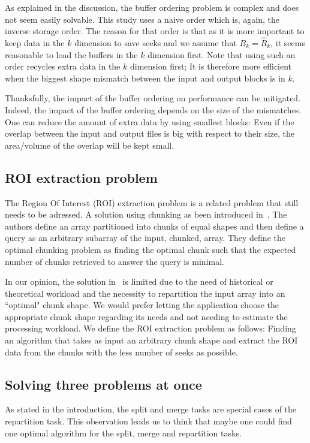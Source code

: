 \documentclass[sigconf, nonacm]{acmart}
\begin{document}
As explained in the discussion, the buffer ordering problem is complex and does
not seem easily solvable.
This study uses a naive order which is, again, the inverse storage order.
The reason for that order is that as it is more important to keep data in the
$k$ dimension to save seeks and we assume that $B_k=\hat R_k$, it seems
reasonable to load the buffers in the $k$ dimension first.
Note that using such
an order recycles extra data in the $k$ dimension first; It is therefore
more efficient when the biggest shape mismatch between the input and output
blocks is in $k$.

Thanksfully, the impact of the buffer ordering on performance can be
mitigated. Indeed, the impact of the buffer ordering depends on the size of the
mismatches. One can reduce the amount of extra data by using smallest blocks: Even
if the overlap between the input and output files is big with respect to their
size, the area/volume of the overlap will be kept small.

\subsection{ROI extraction problem}
The Region Of Interest (ROI) extraction problem is a related problem that still
needs to be adressed.
A solution using chunking as been introduced in~\cite{optimal_chuking}.
The authors define an array partitioned into chunks of equal shapes and then
define a query as an arbitrary subarray of the input, chunked, array.
They define the optimal chunking problem as finding the optimal chunk such
that the expected number of chunks retrieved to answer the query is minimal.

In our opinion, the solution in~\cite{optimal_chuking} is limited due to the
need of historical or theoretical workload and the necessity to repartition the
input array into an ``optimal" chunk shape.
We would prefer letting the application choose the appropriate chunk shape
regarding its needs and not needing to estimate the processing workload.
We define the ROI extraction problem as follows: Finding an algorithm that takes
as input an arbitrary chunk shape and extract the ROI data from the chunks with
the less number of seeks as possible.

\subsection{Solving three problems at once}
As stated in the introduction, the split and merge tasks are special cases of
the repartition task. This observation leads us to think that maybe one could find
one optimal algorithm for the split, merge and repartition tasks.
\end{document}
